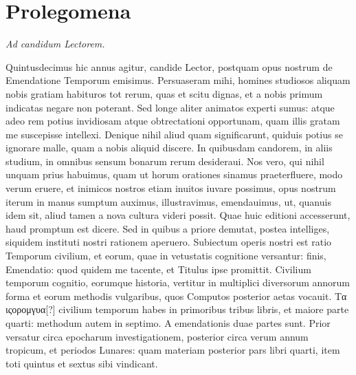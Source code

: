 

\chapter{Prolegomena}
\begin{center}
\end{center}
\begin{center}
\em{Ad candidum Lectorem.}
\end{center}
\normalfont{}

Quintusdecimus hic annus agitur, candide
Lector, postquam opus nostrum de
Emendatione Temporum emisimus.
Persuaseram
mihi, homines studiosos aliquam nobis
gratiam habituros tot rerum, quas et scitu
dignas, et a nobis primum indicatas negare
non poterant.
Sed longe aliter animatos experti
sumus: atque adeo rem potius invidiosam
atque obtrectationi opportunam, quam illis gratam me suscepisse
intellexi.
Denique nihil aliud quam significarunt, quiduis potius
se ignorare malle, quam a nobis aliquid discere.
In quibusdam
candorem, in aliis studium, in omnibus sensum bonarum rerum desideraui.
Nos vero, qui nihil unquam prius habuimus, quam ut horum
orationes sinamus praeterfluere, modo verum eruere, et inimicos
nostros etiam inuitos iuvare possimus, opus nostrum iterum in
manus sumptum auximus, illustravimus, emendauimus, ut, quanuis
idem sit, aliud tamen a nova cultura videri possit.
Quae huic editioni
accesserunt, haud promptum est dicere.
Sed in quibus a priore demutat,
postea intelliges, siquidem instituti nostri rationem aperuero.
Subiectum operis nostri est ratio Temporum civilium, et eorum,
quae in vetustatis cognitione versantur: finis, Emendatio: quod quidem
me tacente, et Titulus ipse promittit.
Civilium temporum cognitio,
eorumque historia, vertitur in multiplici diversorum annorum
forma et eorum methodis vulgaribus, quos Computos posterior
aetas vocauit.
\textgreek{Τα ιςορομγυα[?]} civilium temporum habes in primoribus
tribus libris, et maiore parte quarti: methodum autem in septimo.
A emendationis duae partes sunt.
Prior versatur circa epocharum
investigationem, posterior circa verum annum tropicum, 
et periodos Lunares: quam materiam posterior pars libri quarti,
item toti quintus et sextus sibi vindicant.

